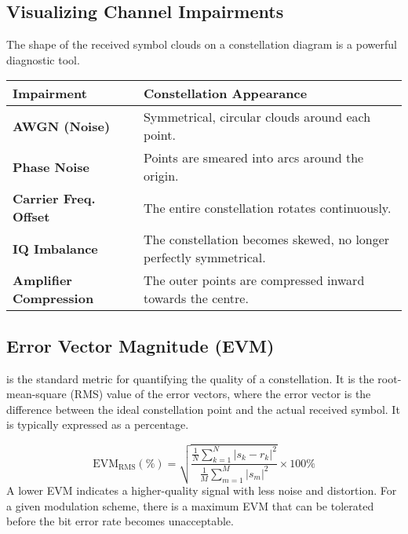 \subsection{Visualizing Channel Impairments}

The shape of the received symbol clouds on a constellation diagram is a powerful diagnostic tool.

\begin{center}
    \begin{tabular}{@{}ll@{}}
        \toprule
        \tableheaderfont Impairment & \tableheaderfont Constellation Appearance \\
        \midrule
        \textbf{AWGN (Noise)} & Symmetrical, circular clouds around each point. \\
        \textbf{Phase Noise} & Points are smeared into arcs around the origin. \\
        \textbf{Carrier Freq. Offset} & The entire constellation rotates continuously. \\
        \textbf{IQ Imbalance} & The constellation becomes skewed, no longer perfectly symmetrical. \\
        \textbf{Amplifier Compression} & The outer points are compressed inward towards the centre. \\
        \bottomrule
    \end{tabular}
\end{center}


\subsection{Error Vector Magnitude (EVM)}

 is the standard metric for quantifying the quality of a constellation. It is the root-mean-square (RMS) value of the error vectors, where the error vector is the difference between the ideal constellation point and the actual received symbol. It is typically expressed as a percentage.

\begin{equation}
    \text{EVM}_{\text{RMS}} (\%) = \sqrt{\frac{\frac{1}{N}\sum_{k=1}^{N}|s_k - r_k|^2}{\frac{1}{M}\sum_{m=1}^{M}|s_m|^2}} \times 100\%
\end{equation}
A lower EVM indicates a higher-quality signal with less noise and distortion. For a given modulation scheme, there is a maximum EVM that can be tolerated before the bit error rate becomes unacceptable.

